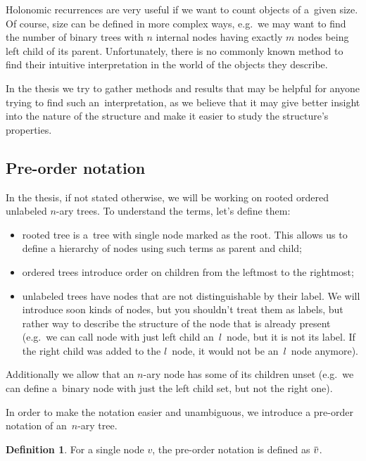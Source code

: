\documentclass[final]{article}
\theoremstyle{definition}
\newtheorem{definition}{Definition}[subsection]
\theoremstyle{definition}
\theoremstyle{remark}
\newcommand{\ols}[1]{\mskip.5\thinmuskip\overline{\mskip-.5\thinmuskip {#1} \mskip-.5\thinmuskip}\mskip.5\thinmuskip} %
\newcommand{\enc}[1]{\ensuremath{\ols{#1}}}
\begin{document}
Holonomic recurrences are very useful if we want to count objects of a~given size. Of course, size can be defined in more complex ways, e.g.~we may want to find the number of binary trees with \(n\) internal nodes having exactly \(m\) nodes being left child of its parent. Unfortunately, there is no commonly known method to find their intuitive interpretation in the world of the objects they describe.

In the thesis we try to gather methods and results that may be helpful for anyone trying to find such an~interpretation, as we believe that it may give better insight into the nature of the structure and make it easier to study the structure's properties.

\subsection{Pre-order notation}%
\label{sub:pre_order_notation}

In the thesis, if not stated otherwise, we will be working on rooted ordered unlabeled \(n\)-ary trees. To understand the terms, let's define them:
\begin{itemize}
    \item rooted tree is a~tree with single node marked as the root. This allows us to define a hierarchy of nodes using such terms as parent and child;
    \item ordered trees introduce order on children from the leftmost to the rightmost;
    \item unlabeled trees have nodes that are not distinguishable by their label. We will introduce soon kinds of nodes, but you shouldn't treat them as labels, but rather way to describe the structure of the node that is already present (e.g.~we can call node with just left child an~\(l\)~node, but it is not its label. If the right child was added to the \(l\)~node, it would not be an~\(l\)~node anymore).
\end{itemize}
Additionally we allow that an \(n\)-ary node has some of its children unset (e.g.~we can define a~binary node with just the left child set, but not the right one).

In order to make the notation easier and unambiguous, we introduce a pre-order notation of an~\(n\)-ary tree.

\begin{definition}
    For a single node \(v\), the pre-order notation is defined as \(\enc{v}\).
\end{definition}
\end{document}
